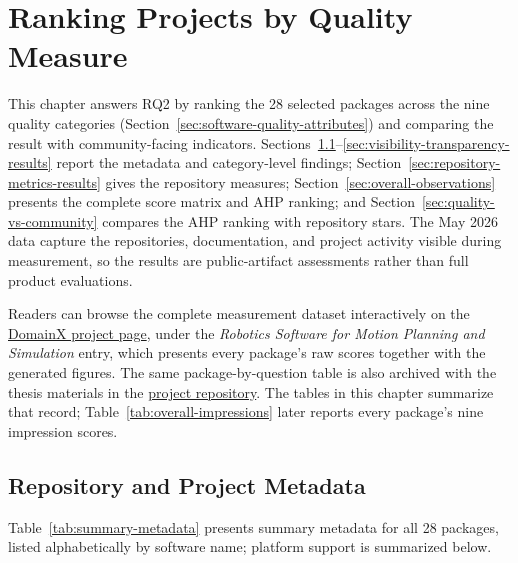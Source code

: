 \chapter{Ranking Projects by Quality Measure}
\label{ch:measurement-results}

This chapter answers RQ2 by ranking the 28 selected packages across the nine quality categories (Section~\ref{sec:software-quality-attributes}) and comparing the result with community-facing indicators. Sections~\ref{sec:repository-project-metadata}--\ref{sec:visibility-transparency-results} report the metadata and category-level findings; Section~\ref{sec:repository-metrics-results} gives the repository measures; Section~\ref{sec:overall-observations} presents the complete score matrix and AHP ranking; and Section~\ref{sec:quality-vs-community} compares the AHP ranking with repository stars. The May 2026 data capture the repositories, documentation, and project activity visible during measurement, so the results are public-artifact assessments rather than full product evaluations.

Readers can browse the complete measurement dataset interactively on the \href{https://domainx.cas.mcmaster.ca}{DomainX project page}, under the \emph{Robotics Software for Motion Planning and Simulation} entry, which presents every package's raw scores together with the generated figures. The same package-by-question table is also archived with the thesis materials in the \href{https://github.com/FangZiyang/Robotics-Software-for-Motion-Planning-and-Simulation/blob/main/AI-Agent/summary_measured.csv}{project repository}. The tables in this chapter summarize that record; Table~\ref{tab:overall-impressions} later reports every package's nine impression scores.

\section{Repository and Project Metadata}
\label{sec:repository-project-metadata}

Table~\ref{tab:summary-metadata} presents summary metadata for all 28 packages, listed alphabetically by software name; platform support is summarized below.

